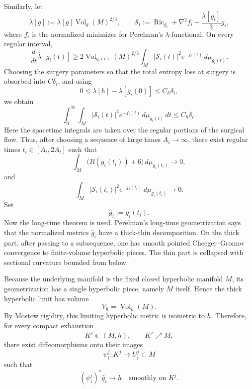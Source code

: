 \documentclass{amsart}
\begin{document}
\noindent Similarly, let
\[
\overline\lambda[g]
:=
\lambda[g]\operatorname{Vol}_{g}(M)^{2/3},
\qquad
\mathcal S_i
:=
\operatorname{Ric}_{g_i}
+\nabla^2 f_i-\frac{\lambda[g_i]}{3}g_i,
\]
where \(f_i\) is the normalized minimizer for Perelman's
\(\lambda\)-functional. On every regular interval,
\[
\frac{d}{dt}\overline\lambda[g_i(t)]
\geq
2\operatorname{Vol}_{g_i(t)}(M)^{2/3}
\int_M|\mathcal S_i(t)|^2e^{-f_i(t)}\,d\mu_{g_i(t)}.
\]
Choosing the surgery parameters so that the total entropy loss at
surgery is absorbed into \(C\delta_i\), and using
\[
0\leq \overline\lambda[h]-\overline\lambda[g_i(0)]
\leq C_h\delta_i,
\]
we obtain
\begin{equation}
\label{eq:spacetime}
\int_0^\infty\int_M
|\mathcal S_i(t)|^2e^{-f_i(t)}\,d\mu_{g_i(t)}\,dt
\leq C_h\delta_i.
\end{equation}
Here the spacetime integrals are taken over the regular portions of the
surgical flow.
Thus, after choosing a sequence of large times \(A_i\to\infty\), there exist regular times
$ t_i\in[A_i,2A_i]$
such that
\[
        \int_M
        \bigl(R(g_i(t_i))+6\bigr)\,d\mu_{g_i(t_i)}
        \to0,
\]
and
\[
        \int_M
        |\mathcal S_i(t_i)|^2 e^{-f_i(t_i)}\,d\mu_{g_i(t_i)}
        \to0.
\]
Set
\[
        \widehat g_i:=g_i(t_i).
\]
Now the long-time theorem is used.  Perelman's long-time geometrization says
that the normalized metrics \(\widehat g_i\) have a thick-thin
decomposition.  On the thick part, after passing to a subsequence, one has
smooth pointed Cheeger--Gromov convergence to finite-volume hyperbolic
pieces.  The thin part is collapsed with sectional curvature bounded from
below.

\noindent Because the underlying manifold is the fixed closed hyperbolic manifold
\(M\), its geometrization has a single hyperbolic piece, namely \(M\)
itself.  Hence the thick hyperbolic limit has volume
\[
        V_h=\operatorname{Vol}_h(M).
\]
By Mostow rigidity, this limiting hyperbolic metric is isometric to \(h\).
Therefore, for every compact exhaustion
\[
        K^j\Subset (M,h),
        \qquad
        K^j\nearrow M,
\]
there exist diffeomorphisms onto their images
\[
        \psi_i^j:K^j\to U_i^j\subset M
\]
such that
\[
        (\psi_i^j)^*\widehat g_i\to h
        \quad\text{smoothly on }K^j.
\]
\end{document}
